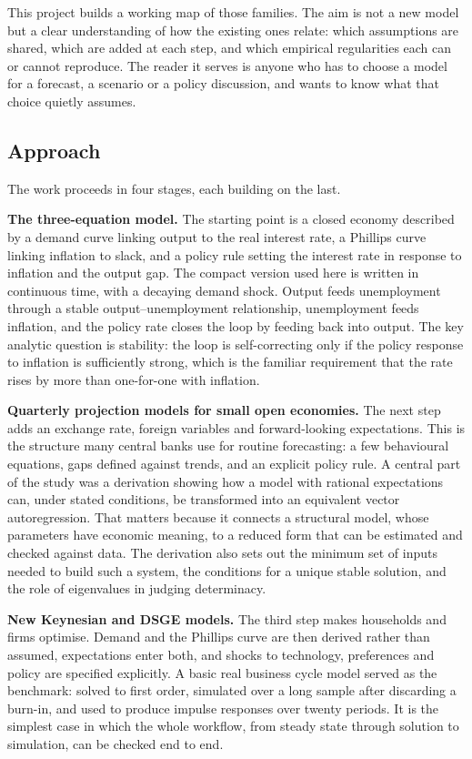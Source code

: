 \documentclass[
  british,
  a4paper,
]{article}
\begin{document}
This project builds a working map of those families. The aim is not a
new model but a clear understanding of how the existing ones relate:
which assumptions are shared, which are added at each step, and which
empirical regularities each can or cannot reproduce. The reader it
serves is anyone who has to choose a model for a forecast, a scenario or
a policy discussion, and wants to know what that choice quietly assumes.

\subsection{Approach}\label{approach}

The work proceeds in four stages, each building on the last.

\textbf{The three-equation model.} The starting point is a closed
economy described by a demand curve linking output to the real interest
rate, a Phillips curve linking inflation to slack, and a policy rule
setting the interest rate in response to inflation and the output gap.
The compact version used here is written in continuous time, with a
decaying demand shock. Output feeds unemployment through a stable
output--unemployment relationship, unemployment feeds inflation, and the
policy rate closes the loop by feeding back into output. The key
analytic question is stability: the loop is self-correcting only if the
policy response to inflation is sufficiently strong, which is the
familiar requirement that the rate rises by more than one-for-one with
inflation.

\textbf{Quarterly projection models for small open economies.} The next
step adds an exchange rate, foreign variables and forward-looking
expectations. This is the structure many central banks use for routine
forecasting: a few behavioural equations, gaps defined against trends,
and an explicit policy rule. A central part of the study was a
derivation showing how a model with rational expectations can, under
stated conditions, be transformed into an equivalent vector
autoregression. That matters because it connects a structural model,
whose parameters have economic meaning, to a reduced form that can be
estimated and checked against data. The derivation also sets out the
minimum set of inputs needed to build such a system, the conditions for
a unique stable solution, and the role of eigenvalues in judging
determinacy.

\textbf{New Keynesian and DSGE models.} The third step makes households
and firms optimise. Demand and the Phillips curve are then derived
rather than assumed, expectations enter both, and shocks to technology,
preferences and policy are specified explicitly. A basic real business
cycle model served as the benchmark: solved to first order, simulated
over a long sample after discarding a burn-in, and used to produce
impulse responses over twenty periods. It is the simplest case in which
the whole workflow, from steady state through solution to simulation,
can be checked end to end.
\end{document}
